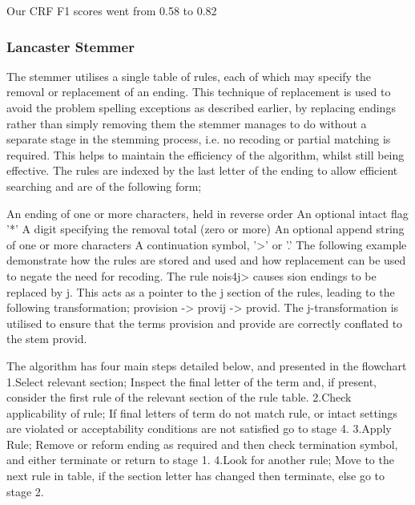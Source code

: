 \documentclass[preprint]{style}
\begin{document}
Our CRF F1 scores went from 0.58 to 0.82

\subsubsection{Lancaster Stemmer}

The stemmer utilises a single table of rules, each of which may specify the removal or replacement of an ending. This technique of replacement is used to avoid the problem spelling exceptions as described earlier, by replacing endings rather than simply removing them the stemmer manages to do without a separate stage in the stemming process, i.e. no recoding or partial matching is required. This helps to maintain the efficiency of the algorithm, whilst still being effective. The rules are indexed by the last letter of the ending to allow efficient searching and are of the following form;

An ending of one or more characters, held in reverse order
An optional intact flag '*'
A digit specifying the removal total (zero or more)
An optional append string of one or more characters
A continuation symbol, '>' or '.'
The following example demonstrate how the rules are stored and used and how replacement can be used to negate the need for recoding. The rule nois4j> causes sion endings to be replaced by j. This acts as a pointer to the j section of the rules, leading to the following transformation; provision -> provij -> provid. The j-transformation is utilised to ensure that the terms provision and provide are correctly conflated to the stem provid.

The algorithm has four main steps detailed below, and presented in the flowchart 
1.Select relevant section; Inspect the final letter of the term and, if present, consider the first rule of the relevant section of the rule table.
2.Check applicability of rule; If final letters of term do not match rule, or intact settings are violated or acceptability conditions are not satisfied go to stage 4.
3.Apply Rule; Remove or reform ending as required and then check termination symbol, and either terminate or return to stage 1.
4.Look for another rule; Move to the next rule in table, if the section letter has changed then terminate, else go to stage 2.
\end{document}
